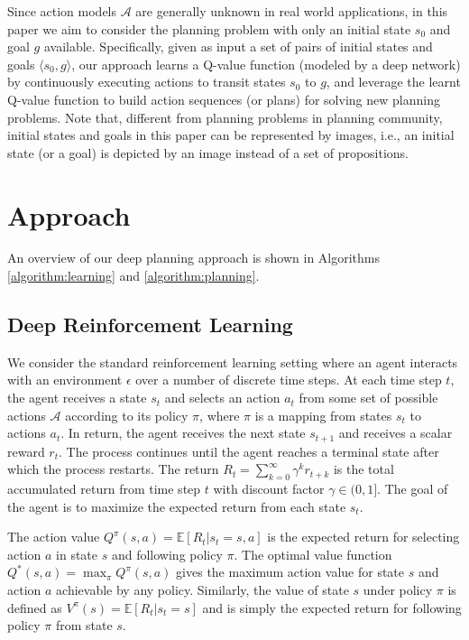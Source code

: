 \documentclass[letterpaper]{article}
\begin{document}
Since action models $\mathcal{A}$ are generally unknown in real world applications, in this paper we aim to consider the planning problem with only an initial state $s_0$ and goal $g$ available. Specifically, given as input a set of pairs of initial states and goals $\langle s_0,g\rangle$, our approach learns a Q-value function (modeled by a deep network) by continuously executing actions to transit states $s_0$ to $g$, and leverage the learnt Q-value function to build action sequences (or plans) for solving new planning problems. Note that, different from planning problems in planning community, initial states and goals in this paper can be represented by images, i.e., an initial state (or a goal) is depicted by an image instead of a set of propositions. 

\section{Approach}
An overview of our deep planning approach is shown in Algorithms \ref{algorithm:learning} and \ref{algorithm:planning}. 

\subsection{Deep Reinforcement Learning}
We consider the standard reinforcement learning setting where an agent interacts with an environment $\epsilon$ over a number of discrete time steps. At each time step $t$, the agent receives a state $s_t$ and selects an action $a_t$ from some set of possible actions $\mathcal{A}$ according to its policy $\pi$, where $\pi$ is a mapping from states $s_t$ to actions $a_t$. In return, the agent receives the next state $s_{t+1}$ and receives a scalar reward $r_t$. The process continues until the agent reaches a terminal state after which the process restarts. The return $R_t=\sum_{k=0}^{\infty}\gamma^kr_{t+k}$ is the total accumulated return from time step $t$ with discount factor $\gamma\in (0,1]$. The goal of the agent is to maximize the expected return from each state $s_t$. 

The action value $Q^{\pi}(s,a)=\mathbb{E}[R_t|s_t=s,a]$ is the expected return for selecting action $a$ in state $s$ and following policy $\pi$. The optimal value function $Q^*(s,a)=\max_{\pi}Q^{\pi}(s,a)$ gives the maximum action value for state $s$ and action $a$ achievable by any policy. Similarly, the value of state $s$ under policy $\pi$ is defined as $V^{\pi}(s)=\mathbb{E}[R_t|s_t=s]$ and is simply the expected return for following policy $\pi$ from state $s$.
\end{document}
